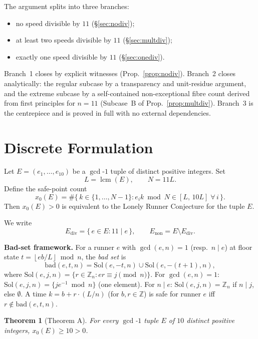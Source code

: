 \documentclass[11pt]{article}
\newtheorem{theorem}{Theorem}[section]
\theoremstyle{definition}
\newcommand{\Ediv}{E_{\mathrm{div}}}
\newcommand{\Enon}{E_{\mathrm{non}}}
\newcommand{\bad}{\mathrm{bad}}
\newcommand{\Sol}{\mathrm{Sol}}
\newcommand{\lcm}{\operatorname{lcm}}
\newcommand{\floor}[1]{\left\lfloor #1 \right\rfloor}
\begin{document}
The argument splits into three branches:
\begin{itemize}
  \item no speed divisible by $11$ (\S\ref{sec:nodiv});
  \item at least two speeds divisible by $11$ (\S\ref{sec:multdiv});
  \item exactly one speed divisible by $11$ (\S\ref{sec:onediv}).
\end{itemize}

Branch~1 closes by explicit witnesses (Prop.~\ref{prop:nodiv}).
Branch~2 closes analytically: the regular subcase by a transparency
and unit-residue argument, and the extreme subcase by a self-contained
non-exceptional fibre count derived from first principles for $n = 11$
(Subcase~B of Prop.~\ref{prop:multdiv}).
Branch~3 is the centrepiece and is proved in full with no external
dependencies.

\section{Discrete Formulation}
\label{sec:formulation}

Let $E = (e_1, \ldots, e_{10})$ be a $\gcd$-$1$ tuple of distinct
positive integers. Set
\[
  L = \lcm(E), \qquad N = 11L.
\]
Define the safe-point count
\[
  x_0(E) = \#\bigl\{\, k \in \{1,\ldots,N{-}1\}
    : e_i k \bmod N \in [L,\, 10L] \;\forall\, i \,\bigr\}.
\]
Then $x_0(E) > 0$ is equivalent to the Lonely Runner Conjecture for
the tuple $E$.

We write
\[
  \Ediv = \{\, e \in E : 11 \mid e \,\}, \qquad
  \Enon = E \setminus \Ediv.
\]

\medskip
\noindent\textbf{Bad-set framework.}
For a runner $e$ with $\gcd(e,n) = 1$ (resp.\ $n \mid e$) at floor
state $t = \floor{eb/L} \bmod n$, the \emph{bad set} is
\[
  \bad(e, t, n) = \Sol(e, -t, n) \cup \Sol(e, -(t{+}1), n),
\]
where $\Sol(e, j, n) = \{r \in \mathbb{Z}_n : er \equiv j \pmod{n}\}$.
For $\gcd(e,n) = 1$: $\Sol(e, j, n) = \{j e^{-1} \bmod n\}$ (one
element).
For $n \mid e$: $\Sol(e, j, n) = \mathbb{Z}_n$ if $n \mid j$, else
$\emptyset$.
A time $k = b + r \cdot (L/n)$ (for $b, r \in \mathbb{Z}$) is safe for
runner $e$ iff $r \notin \bad(e, t, n)$.

\begin{theorem}[Theorem A]
  \label{thm:main}
  For every $\gcd$-$1$ tuple $E$ of $10$ distinct positive integers,
  $x_0(E) \geq 10 > 0$.
\end{theorem}
\end{document}
